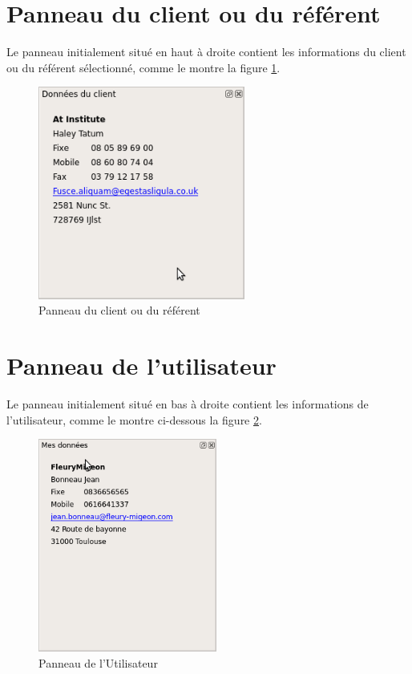 \section{Panneau du client ou du référent}
Le panneau initialement situé en haut à droite contient les informations du client ou du référent sélectionné, comme le montre la figure
\ref{fig:dockClient}.

\begin{figure}[H]
	\centering
	\includegraphics[height=7cm]{screens/dockClient.png}
	\caption{Panneau du client ou du référent}
	\label{fig:dockClient}
\end{figure}

\section{Panneau de l'utilisateur}
Le panneau initialement situé en bas à droite contient les informations de l'utilisateur, comme le montre ci-dessous la figure
\ref{fig:dockUtilisateur}.

\begin{figure}[H]
	\centering
	\includegraphics[height=7cm]{screens/dockUtilisateur.png}
	\caption{Panneau de l'Utilisateur}
	\label{fig:dockUtilisateur}
\end{figure}
